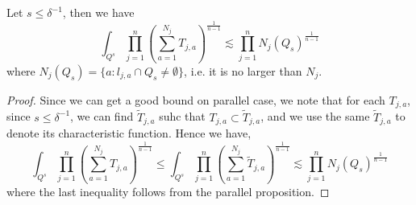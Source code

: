 \begin{lemma}
    Let $s\leq\delta^{-1}$, then we have
    \begin{equation*}
        \int_{Q^s}\prod_{j=1}^n\left(\sum_{a=1}^{N_j}T_{j,a}\right)^{\frac{1}{n-1}}\lesssim \prod_{j=1}^nN_j(Q_s)^{\frac{1}{n-1}}
    \end{equation*}
    where $N_j(Q_s)=\{a: l_{j,a}\cap Q_s\neq\emptyset \}$, i.e. it is no larger than $N_j$.
\end{lemma}
\begin{proof}
    Since we can get a good bound on parallel case, we note that for each $T_{j,a}$, since $s\leq\delta^{-1}$, we can find $\tilde{T}_{j,a}$ suhc that $T_{j,a}\subset\tilde{T}_{j,a}$, and we use the same $\tilde{T}_{j,a}$ to denote its characteristic function. Hence we have,
    \begin{equation*}
        \int_{Q^s}\prod_{j=1}^n\left(\sum_{a=1}^{N_j}T_{j,a}\right)^{\frac{1}{n-1}}\leq \int_{Q^s}\prod_{j=1}^n\left(\sum_{a=1}^{N_j}\tilde{T}_{j,a}\right)^{\frac{1}{n-1}}\lesssim \prod_{j=1}^nN_j(Q_s)^{\frac{1}{n-1}}
    \end{equation*}
    where the last inequality follows from the parallel proposition.
\end{proof}


